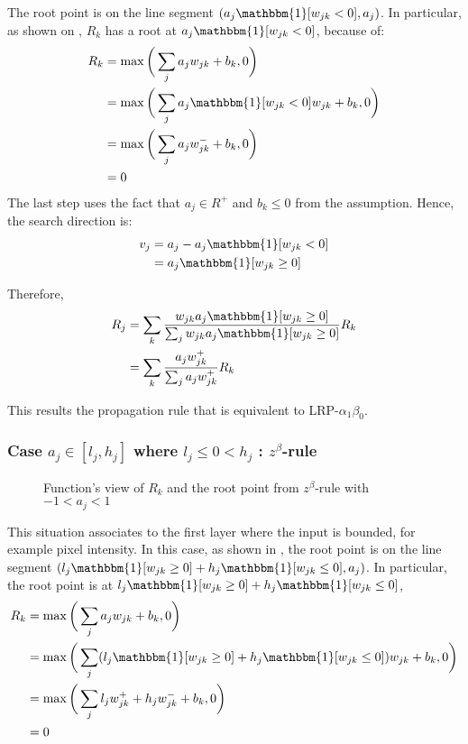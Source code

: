 The root point is on the line segment $( a_j \mathbbm{1}[ w_{jk}  < 0 ], a_j )$. In particular, as shown on \addfigure{\ref{fig:zplus_rule_cases}}, $R_k$ has a root at $a_j \mathbbm{1}[w_{jk}  < 0 ]$, because of:
\begin{align}	
R_k &= \max \bigg( \sum_j a_j w_{jk } + b_k, 0 \bigg) \\
&=  \max \bigg( \sum_j a_j \mathbbm{1}[ w_{jk}  < 0 ] w_{jk} + b_k, 0 \bigg) \\
&=  \max \bigg(\sum_j a_j  w_{jk}^- + b_k , 0\bigg) \\
&= 0 \label{eq:zplus_rk_zero}
\end{align}
The last step uses the fact that $a_j \in R^+$ and $b_k \le 0$ from the assumption. Hence, the search direction is:
\begin{align}
	v_j &= a_j - a_j \mathbbm{1}[ w_{jk}  < 0 ] \\
	&= a_j \mathbbm{1}[ w_{jk}  \ge 0 ]
\end{align}




Therefore, 
\begin{align}
		R_j &=	\sum_k \frac{ w_{jk} a_j \mathbbm{1}[w_{jk}  \ge 0 ]  }{\sum_{j} w_{jk} a_j \mathbbm{1}[ w_{jk}  \ge 0 ]}  R_k\\
		&=	\sum_k  \frac{ a_j  w_{jk}^+   }{\sum_{j}  a_j w_{jk}^+  }  R_k
\end{align}

This results the propagation rule that  is equivalent to LRP-$\alpha_1\beta_0$. 


\subsubsection{Case $a_j \in [l_j , h_j]$ where $l_j \le 0 < h_j $ : $z^\beta$-rule}

\begin{figure}[!htb]
\centering
{}
\caption{Function's view of $R_k$ and the root point from $z^\beta$-rule with $-1 < a_j < 1$ }
\label{fig:zbeta_rule_cases}
\end{figure}
This situation associates to the first layer where the input is bounded, for example pixel intensity. In this case, as shown in \addfigure{\ref{fig:zbeta_rule_cases}}, the root point is on the line segment $( l_j \mathbbm{1}[ w_{jk}  \ge 0 ]  + h_j \mathbbm{1}[ w_{jk}  \le 0 ]  , a_j ) $. In particular, the root point is at $l_j \mathbbm{1}[ w_{jk}  \ge 0 ]  + h_j \mathbbm{1}[ w_{jk}  \le 0 ]$,
\begin{align}
R_k &= \max \bigg( \sum_j a_j w_{jk } + b_k, 0 \bigg) \\
&=\max \bigg( \sum_j (l_j \mathbbm{1}[ w_{jk}  \ge 0 ]  + h_j \mathbbm{1}[ w_{jk}  \le 0 ] ) w_{jk } + b_k, 0 \bigg) \\
&= \max \bigg( \sum_j l_j w_{jk }^+   + h_j w_{jk }^-  + b_k, 0 \bigg) \\
&= 0
\end{align}

